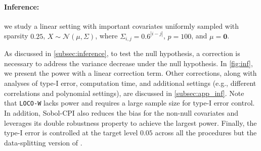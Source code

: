 \documentclass{article}
\theoremstyle{plain}
\theoremstyle{definition}
\theoremstyle{remark}
\begin{document}
\paragraph{Inference:} we study a linear setting with important covariates uniformly sampled with sparsity $0.25$, $X \sim \mathcal{N}(\mu, \Sigma) $, where $ \Sigma_{i,j} = 0.6^{|i-j|}$, $p = 100 $, and $\mu = \mathbf{0}$.

As discussed in  \cref{subsec:inference}, to test the null hypothesis, a correction is necessary to address the variance decrease under the null hypothesis. %
%
%
%
%
In \cref{fig:inf}, we present the power with a linear correction term. 
%
Other corrections, along with analyses of type-I error, computation time, and additional settings (e.g., different correlations and polynomial settings), are discussed in \cref{subsec:app_inf}. 
%
Note that \texttt{LOCO-W} lacks power and requires a large sample size for type-I error control. 
In addition, Sobol-CPI also reduces the bias for the non-null covariates and leverages its double robustness property to achieve the largest power. 
%
Finally,  the type-I error is controlled at the target level $0.05$ across all the procedures but the data-splitting version of \citet{williamson2023general}. 
%
\end{document}
